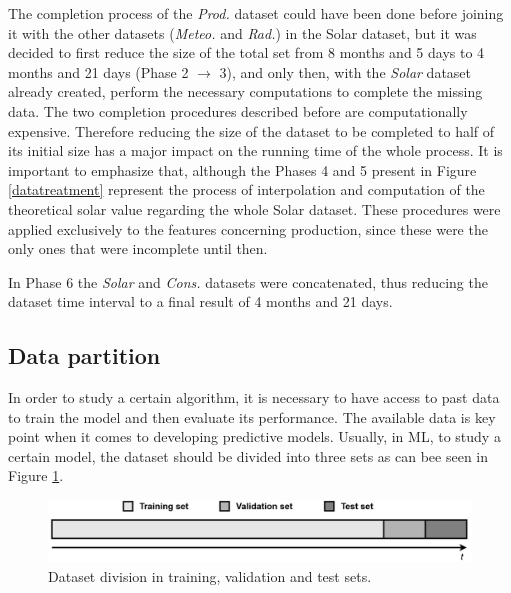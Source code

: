 The completion process of the \textit{Prod.} dataset could have been done before joining it with the other datasets (\textit{Meteo.} and \textit{Rad.}) in the Solar dataset, but it was decided to first reduce the size of the total set from 8 months and 5 days to 4 months and 21 days (Phase 2 $\to$ 3), and only then, with the \textit{Solar} dataset already created, perform the necessary computations to complete the missing data. The two completion procedures described before are computationally expensive. Therefore reducing the size of the dataset to be completed to half of its initial size has a major impact on the running time of the whole process. It is important to emphasize that, although the Phases 4 and 5 present in Figure \ref{datatreatment} represent the process of interpolation and computation of the theoretical solar value regarding the whole Solar dataset. These procedures were applied exclusively to the features concerning production, since these were the only ones that were incomplete until then.


In Phase 6 the \textit{Solar} and \textit{Cons.} datasets were concatenated, thus reducing the dataset time interval to a final result of 4 months and 21 days.

\subsection{Data partition}\label{chap3:subsec:data_partition}

In order to study a certain algorithm, it is necessary to have access to past data to train the model and then evaluate its performance. The available data is key point when it comes to developing predictive models. Usually, in \ac{ML}, to study a certain model, the dataset should be divided into three sets as can bee seen in Figure \ref{division}. 

\begin{figure}[h!]
    \centering
    \begin{center}
    \includegraphics[width=1\textwidth]{Images/division.png}
    \caption{Dataset division in training, validation and test sets.}
    \label{division}
    \end{center}
\end{figure}

